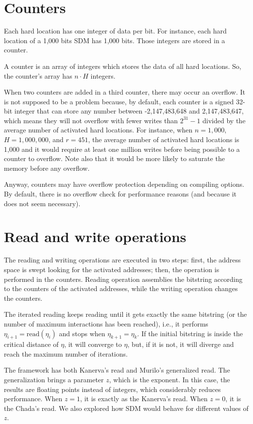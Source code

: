 \section{Counters}

Each hard location has one integer of data per bit. For instance, each hard location of a 1,000 bits SDM has 1,000 bits. Those integers are stored in a counter.

A counter is an array of integers which stores the data of all hard locations. So, the counter's array has $n \cdot H$ integers.

When two counters are added in a third counter, there may occur an overflow. It is not supposed to be a problem because, by default, each counter is a signed 32-bit integer that can store any number between -2,147,483,648 and 2,147,483,647, which means they will not overflow with fewer writes than $2^{31}-1$ divided by the average number of activated hard locations. For instance, when $n=1,000$, $H=1,000,000$, and $r=451$, the average number of activated hard locations is 1,000 and it would require at least one million writes before being possible to a counter to overflow.  Note also that it would be more likely to saturate the memory before any overflow.

Anyway, counters may have overflow protection depending on compiling options. By default, there is no overflow check for performance reasons (and because it does not seem necessary).

\section{Read and write operations}

The reading and writing operations are executed in two steps: first, the address space is swept looking for the activated addresses; then, the operation is performed in the counters. Reading operation assemblies the bitstring according to the counters of the activated addresses, while the writing operation changes the counters.

The iterated reading keeps reading until it gets exactly the same bitstring (or the number of maximum interactions has been reached), i.e., it performs $\eta_{i+1} = \text{read}(\eta_i)$ and stops when $\eta_{k+1} = \eta_{k}$. If the initial bitstring is inside the critical distance of $\eta$, it will converge to $\eta$, but, if it is not, it will diverge and reach the maximum number of iterations.

The framework has both Kanerva's read and Murilo's generalized read. The generalization brings a parameter $z$, which is the exponent. In this case, the results are floating points instead of integers, which considerably reduces performance. When $z=1$, it is exactly as the Kanerva's read. When $z=0$, it is the Chada's read. We also explored how SDM would behave for different values of $z$.

